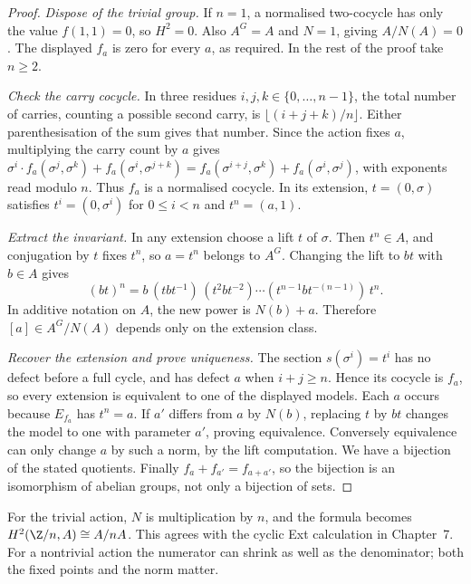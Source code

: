 \begin{proof}
\emph{Dispose of the trivial group.} If $n=1$, a normalised two-cocycle has only the value $f(1,1)=0$, so $H^2=0$. Also $A^G=A$ and $N=1$, giving $A/N(A)=0$. The displayed $f_a$ is zero for every $a$, as required. In the rest of the proof take $n\ge2$.

\emph{Check the carry cocycle.} In three residues $i,j,k\in\{0,\ldots,n-1\}$, the total number of carries, counting a possible second carry, is $\lfloor(i+j+k)/n\rfloor$. Either parenthesisation of the sum gives that number. Since the action fixes $a$, multiplying the carry count by $a$ gives
$\sigma^i\cdot f_a(\sigma^j,\sigma^k)+f_a(\sigma^i,\sigma^{j+k})
=f_a(\sigma^{i+j},\sigma^k)+f_a(\sigma^i,\sigma^j)$,
with exponents read modulo $n$. Thus $f_a$ is a normalised cocycle. In its extension, $t=(0,\sigma)$ satisfies $t^i=(0,\sigma^i)$ for $0\le i<n$ and $t^n=(a,1)$.

\emph{Extract the invariant.} In any extension choose a lift $t$ of $\sigma$. Then $t^n\in A$, and conjugation by $t$ fixes $t^n$, so $a=t^n$ belongs to $A^G$. Changing the lift to $bt$ with $b\in A$ gives
\[
(bt)^n=b\,(tbt^{-1})\,(t^2bt^{-2})\cdots
(t^{n-1}bt^{-(n-1)})\,t^n.
\]
In additive notation on $A$, the new power is $N(b)+a$. Therefore $[a]\in A^G/N(A)$ depends only on the extension class.

\emph{Recover the extension and prove uniqueness.} The section $s(\sigma^i)=t^i$ has no defect before a full cycle, and has defect $a$ when $i+j\ge n$. Hence its cocycle is $f_a$, so every extension is equivalent to one of the displayed models. Each $a$ occurs because $E_{f_a}$ has $t^n=a$.
If $a'$ differs from $a$ by $N(b)$, replacing $t$ by $bt$ changes the model to one with parameter $a'$, proving equivalence. Conversely equivalence can only change $a$ by such a norm, by the lift computation. We have a bijection of the stated quotients. Finally $f_a+f_{a'}=f_{a+a'}$, so the bijection is an isomorphism of abelian groups, not only a bijection of sets.
\end{proof}

For the trivial action, $N$ is multiplication by $n$, and the formula becomes $H^2(\Z/n,A)\cong A/nA$. This agrees with the cyclic Ext calculation in Chapter~7. For a nontrivial action the numerator can shrink as well as the denominator; both the fixed points and the norm matter.

